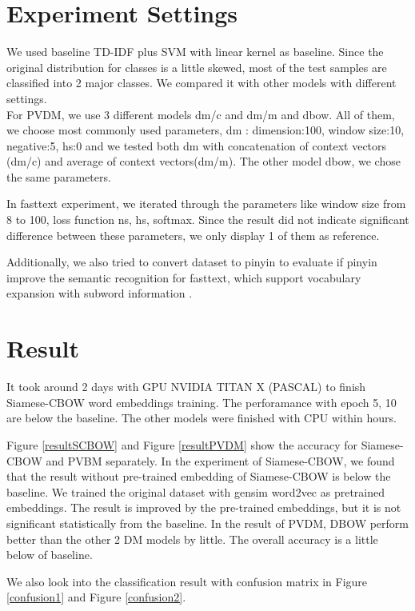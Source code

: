 \section{Experiment Settings}


We used baseline TD-IDF plus SVM with linear kernel as baseline. 
Since the original distribution for classes is a little skewed, most of the test samples are classified into 2 major classes.
We compared it with other models with different settings. \\

For PVDM, we use 3 different models dm/c and dm/m and dbow. All of them, we choose most commonly used parameters, dm : dimension:100, window size:10, negative:5, hs:0 and we tested both dm with concatenation of context vectors (dm/c) and average of context vectors(dm/m). 
The other model dbow, we chose the same parameters.

In fasttext experiment, we iterated through the parameters like window size from 8 to 100, 
loss function ns, hs, softmax.  Since the result did not indicate significant difference between these parameters, 
we only display 1 of them as reference.

Additionally, we also tried to convert dataset to pinyin to evaluate if pinyin improve the semantic recognition for fasttext, 
which support vocabulary expansion with subword information \cite{bojanowski2016enriching}. 

\section{Result}

It took around 2 days with GPU NVIDIA TITAN X (PASCAL) to finish Siamese-CBOW word embeddings training. The perforamance with epoch 5, 10 are below the baseline. 
The other models were finished with CPU within hours.

Figure \ref{resultSCBOW} and Figure \ref{resultPVDM} show the accuracy for Siamese-CBOW and PVBM separately. 
In the experiment of Siamese-CBOW, we found that the result without pre-trained embedding of Siamese-CBOW is below the baseline. We trained the original dataset with gensim word2vec as pretrained embeddings.
The result is improved by the pre-trained embeddings, but it is not significant statistically from the baseline. In the result of PVDM, DBOW perform better than the other 2 DM models by little. 
The overall accuracy is a little below of baseline.

We also look into the classification result with confusion matrix in Figure \ref{confusion1} and Figure \ref{confusion2}.

